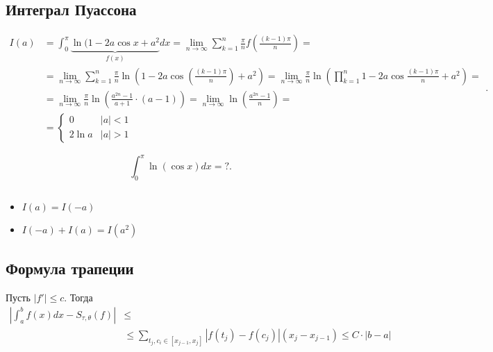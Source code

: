\subsection{Интеграл Пуассона}
\[
\begin{aligned}
    I(a) &= \int_{0}^{\pi} \underbrace{\ln(1 -2 a \cos x + a^2}_{f(x)} dx = \lim_{n \to \infty} \sum_{k=1}^{n} \frac{\pi}{n}f\left( \frac{(k-1)\pi}{n} \right) = \\
	 &= \lim_{n \to \infty} \sum_{k=1}^{n} \frac{\pi}{n} \ln\left(1 - 2a \cos \left( \frac{(k-1)\pi}{n} \right) + a^2\right) = \lim_{n \to \infty} \frac{\pi}{n} \ln\left( \prod_{k=1}^{n} 1 - 2a\cos \frac{(k-1)\pi}{n} + a^2 \right)  =\\
	 &= \lim_{n \to \infty} \frac{\pi}{n} \ln \left( \frac{a^{2n}-1}{a+1}\cdot (a-1) \right) = \lim_{n \to \infty} \ln\left( \frac{a^{2n} - 1}{n} \right) = \\
	 &= 
	 \begin{cases}
	     0&\lvert a \rvert < 1\\
	     2\ln a& \lvert a \rvert > 1
	 \end{cases}
\end{aligned}
.\]
\begin{prac}
     \[
	 \int_{0}^{\pi} \ln (\cos x) dx = ? 
    .\] 
\end{prac}
\begin{prac}

    $ $
    \begin{itemize}[noitemsep]
	\item $ I(a) = I(-a)$
	\item  $ I(-a) + I(a) = I(a^2)$
    \end{itemize}
\end{prac}
\subsection{Формула трапеции}
\begin{st}
    Пусть $ \left| f' \right| \le c$. Тогда
    \[
    \begin{aligned}
	\left| \int_{a}^{b} f(x) dx - S_{\tau , \theta }(f)  \right| & \le \\
								     & \le \sum_{t_j, c_i \in  [x_{j-1}, x_j]}^{} \left| f(t_j) - f(c_j) \right| (x_j - x_{j-1}) \le C \cdot \lvert b - a \rvert 
    \end{aligned}
    \]
\end{st}
    
